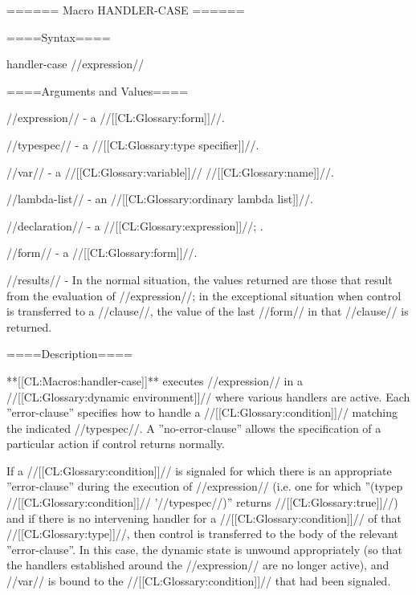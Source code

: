 ====== Macro HANDLER-CASE ======

====Syntax====


\DefmacWithValues handler-case {//expression// } {}

  

====Arguments and Values====

//expression// - a //[[CL:Glossary:form]]//.

//typespec// - a //[[CL:Glossary:type specifier]]//.

//var// - a //[[CL:Glossary:variable]]// //[[CL:Glossary:name]]//.

//lambda-list// - an //[[CL:Glossary:ordinary lambda list]]//.

//declaration// - a  //[[CL:Glossary:expression]]//; \noeval.

//form// - a //[[CL:Glossary:form]]//.

//results// - In the normal situation, the values returned are those that result from the evaluation of //expression//; in the exceptional situation when control is transferred to a //clause//, the value of the last //form// in that //clause// is returned.

====Description====

**[[CL:Macros:handler-case]]** executes //expression// in a //[[CL:Glossary:dynamic environment]]// where various handlers are active. Each ''error-clause'' specifies how to handle a //[[CL:Glossary:condition]]// matching the indicated //typespec//. A ''no-error-clause'' allows the specification of a particular action if control returns normally.


If a //[[CL:Glossary:condition]]// is signaled for which there is an appropriate ''error-clause'' during the execution of //expression// (i.e. one for which ''(typep //[[CL:Glossary:condition]]// '//typespec//)'' returns //[[CL:Glossary:true]]//) and if there is no intervening handler for a //[[CL:Glossary:condition]]// of that //[[CL:Glossary:type]]//, then control is transferred to the body of the relevant ''error-clause''. In this case, the dynamic state is unwound appropriately (so that the handlers established around the //expression// are no longer active), and //var// is bound to the //[[CL:Glossary:condition]]// that had been signaled.

